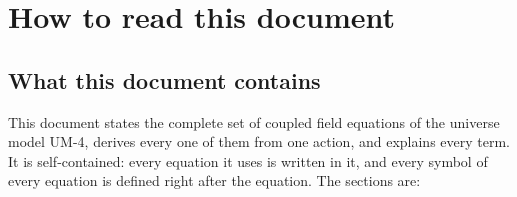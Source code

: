 \documentclass[
  10pt,
]{article}
\begin{document}
\hypertarget{how-to-read-this-document}{%
\section{How to read this document}\label{how-to-read-this-document}}

\hypertarget{what-this-document-contains}{%
\subsection{What this document
contains}\label{what-this-document-contains}}

This document states the complete set of coupled field equations of the
universe model UM-4, derives every one of them from one action, and
explains every term. It is self-contained: every equation it uses is
written in it, and every symbol of every equation is defined right after
the equation. The sections are:
\end{document}
